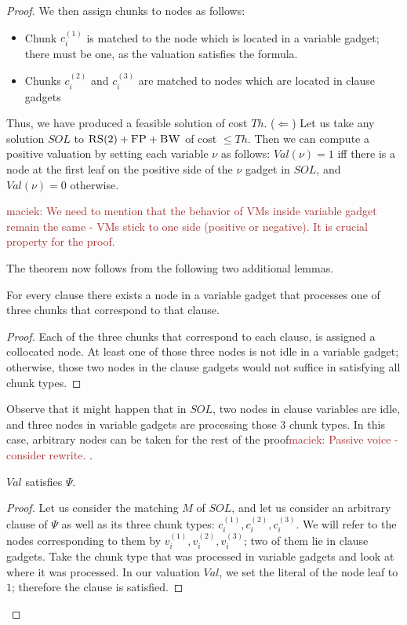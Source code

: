 \documentclass[9pt]{sigcomm-alternate}
\newcommand{\maciek}[1]{\textcolor{brown}{maciek: #1}}
\newcommand{\variab}{\nu}
\newcommand{\achunk}{\ensuremath{c}}
\newcommand{\FP}{\textsc{FP}}
\newcommand{\RS}{\textsc{RS}}
\newcommand{\BW}{\textsc{BW}}
\newcommand{\Formula}{\ensuremath{\Psi}}
\newcommand{\Thr}{\ensuremath{Th}}
\newcommand{\Val}{\ensuremath{Val}}
\newcommand{\Sol}{\ensuremath{SOL}}
\begin{document}
\begin{appendix}
\begin{proof}
We then assign chunks to nodes as follows:
\begin{itemize}
\item Chunk $\achunk_i^{(1)}$ is matched to the node which is located in a variable gadget; there
must be one, as the valuation satisfies the formula.
\item Chunks $\achunk_i^{(2)}$ and $\achunk_i^{(3)}$ are matched to nodes which
are
located in clause
gadgets
\end{itemize}

Thus, we have produced a feasible solution of cost $\Thr$.
($\Leftarrow$)
Let us take any solution $\Sol$ to $\RS(2)+\FP+\BW$ of cost $\leq \Thr$.
Then we can compute a positive valuation by setting each variable $\variab$
as follows:
$\Val(\variab)= 1$ iff there is a node at the first leaf on the positive side of the $\variab$ gadget in $\Sol$,
and $\Val(\variab)=0$ otherwise.

\maciek{We need to mention that the behavior of VMs inside variable gadget remain the same - VMs stick to one side (positive or negative). It is crucial property for the proof.}


The theorem now follows from the following two additional lemmas.
\begin{lemma}
For every clause there exists a node in a variable gadget that processes one of
  three chunks that correspond to that clause.
\end{lemma}
\begin{proof}
 Each of the three chunks that correspond to each clause,
 is assigned a collocated node.
 At least one of those three nodes is not idle in a variable gadget;
otherwise, those two nodes in the clause gadgets would not suffice in
satisfying all chunk types.
\end{proof}

Observe that it might happen that in $\Sol$, two nodes in
clause variables are idle, and three nodes in variable gadgets are
processing those $3$ chunk types. In this case,
arbitrary nodes can be taken for the rest
of the proof\maciek{Passive voice - consider rewrite.}
.

\begin{lemma}
$\Val$ satisfies $\Formula$.
\end{lemma}
\begin{proof}
Let us consider the matching $M$ of $\Sol$, and let us consider an arbitrary clause of
$\Formula$ as well as its three chunk types: $\achunk_i^{(1)}, \achunk_i^{(2)}, \achunk_i^{(3)}$.
We will refer to the nodes corresponding to them
by $v_i^{(1)}, v_i^{(2)}, v_i^{(3)}$; two of them lie in clause gadgets.
Take the chunk type that was processed in variable
gadgets and look at where it was processed.
In our valuation $\Val$, we set the literal of the node leaf to
$1$; therefore the clause is satisfied.
\end{proof}


\end{proof}
\end{appendix}
\end{document}
